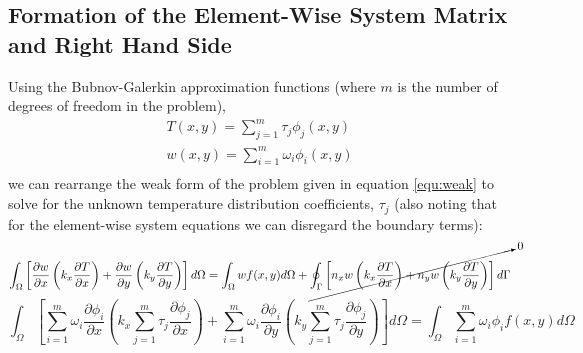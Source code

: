 \documentclass[letterpaper,10pt]{article}
\begin{document}
\subsection{Formation of the Element-Wise System Matrix and Right Hand Side}
Using the Bubnov-Galerkin approximation functions (where $m$ is the number of degrees of freedom in the problem),
\begin{equation}
\label{equ:bubnov-galerkin}
\begin{array}{l}
T(x,y) = \displaystyle\sum\limits_{j=1}^m \tau_j \phi_j(x,y) \\
w(x,y) = \displaystyle\sum\limits_{i=1}^m \omega_i \phi_i(x,y) \\
\end{array}
\end{equation}
\noindent we can rearrange the weak form of the problem given in equation \ref{equ:weak} to solve for the unknown temperature distribution coefficients, $\tau_j$ (also noting that for the element-wise system equations we can disregard the boundary terms):
\[
\int_\Omega \left[\frac{\partial w}{\partial x}\left(k_x\frac{\partial T}{\partial x}\right) + \frac{\partial w}{\partial y}\left(k_y\frac{\partial T}{\partial y}\right) \right]d\Omega = \int_\Omega wf(x,y)d\Omega + \cancelto{0}{\oint_\Gamma \left[n_xw\left(k_x\frac{\partial T}{\partial x}\right) + n_yw\left(k_y\frac{\partial T}{\partial y}\right)\right]d\Gamma}
\]
\[
\int_\Omega \left[\displaystyle\sum\limits_{i=1}^m \omega_i\frac{\partial \phi_i}{\partial x}\left(k_x\displaystyle\sum\limits_{j=1}^m\tau_j\frac{\partial \phi_j}{\partial x}\right) + \displaystyle\sum\limits_{i=1}^m \omega_i\frac{\partial \phi_i}{\partial y}\left(k_y\displaystyle\sum\limits_{j=1}^m\tau_j\frac{\partial \phi_j}{\partial y}\right) \right]d\Omega = \int_\Omega \displaystyle\sum\limits_{i=1}^m \omega_i\phi_if(x,y)d\Omega
\]
\end{document}
